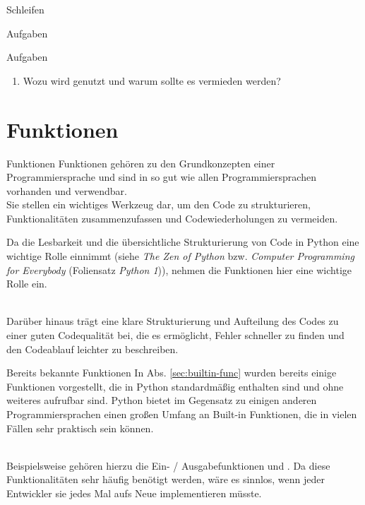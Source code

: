 \begin{subsection}{Schleifen}
\begin{subsubsection}{Aufgaben}
\begin{frame}{Aufgaben}
\begin{enumerate}
                    \item Wozu wird  genutzt und warum sollte es vermieden werden?
                
                    
                \end{enumerate}
            \end{frame}
        \end{subsubsection}
    \end{subsection}
    
    
\section{Funktionen}
    
    \begin{frame}{Funktionen}
        Funktionen gehören zu den Grundkonzepten einer Programmiersprache und sind in so gut wie allen Programmiersprachen vorhanden und verwendbar. \~\\
        
        Sie stellen ein wichtiges Werkzeug dar, um den Code zu strukturieren, Funktionalitäten zusammenzufassen und Codewiederholungen zu vermeiden. 
        
        Da die Lesbarkeit und die übersichtliche Strukturierung von Code in Python eine wichtige Rolle einnimmt (siehe \textit{The Zen of Python} bzw. \textit{Computer Programming for Everybody} (Foliensatz \textit{Python 1})), nehmen die Funktionen hier eine wichtige Rolle ein. \\~\
        
        Darüber hinaus trägt eine klare Strukturierung und Aufteilung des Codes zu einer guten Codequalität bei, die es ermöglicht, Fehler schneller zu finden und den Codeablauf leichter zu beschreiben.
    \end{frame}
    
    \begin{frame}{Bereits bekannte Funktionen}
        In Abs. \ref{sec:builtin-func} wurden bereits einige Funktionen vorgestellt, die in Python standardmäßig enthalten sind und ohne weiteres aufrufbar sind. Python bietet im Gegensatz zu einigen anderen Programmiersprachen einen großen Umfang an Built-in Funktionen, die in vielen Fällen sehr praktisch sein können. \\~\
        
        Beispielsweise gehören hierzu die Ein- / Ausgabefunktionen  und . Da diese Funktionalitäten sehr häufig benötigt werden, wäre es sinnlos, wenn jeder Entwickler sie jedes Mal aufs Neue implementieren müsste.
    \end{frame}
    
